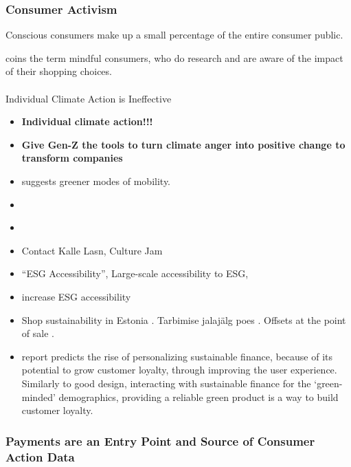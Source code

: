\documentclass[
  letterpaper,
  DIV=11,
  numbers=noendperiod]{scrartcl}
\makeatletter
\let\oldparagraph\paragraph
\renewcommand{\paragraph}{
    \@ifstar
      \xxxParagraphStar
      \xxxParagraphNoStar
  }
\newcommand{\xxxParagraphStar}[1]{\oldparagraph*{#1}\mbox{}}
\newcommand{\xxxParagraphNoStar}[1]{\oldparagraph{#1}\mbox{}}
\makeatother
\begin{document}
\subsubsection{Consumer Activism}\label{consumer-activism}

Conscious consumers make up a small percentage of the entire consumer
public.

\citep{milneMindfulConsumptionThree2020} coins the term mindful
consumers, who do research and are aware of the impact of their shopping
choices.

\paragraph{Individual Climate Action is
Ineffective}\label{individual-climate-action-is-ineffective}

\begin{itemize}
\item
  \citet{kristiansteensennielsenArgumentsIndividualClimate2022}
  \textbf{Individual climate action!!!}
\item
  \textbf{Give Gen-Z the tools to turn climate anger into positive
  change to transform companies}
\item
  \citet{echeverriaGreenMobilityWellbeing2022} suggests greener modes of
  mobility.
\item
  \citet{hymanShoppingChangeConsumer2017}
\item
  \citet{brantleyBrewingBoycottHow2021}
\item
  Contact Kalle Lasn, Culture Jam
\item
  ``ESG Accessibility'', Large-scale accessibility to ESG,
\item
  increase ESG accessibility
\item
  Shop sustainability in Estonia
  \citep{lillevaliUuringVastutustundlikkusEesti2022, EstwatchEstwatchiVarskest}.
  Tarbimise jalajälg poes
  \citep{helensaarmetsTarbimiselSilmagaNahtamatu2021}. Offsets at the
  point of sale \citep{GrenpayHeastaOma}.
\item
  \citet{GreenFintechTrends2020} report predicts the rise of
  personalizing sustainable finance, because of its potential to grow
  customer loyalty, through improving the user experience. Similarly to
  good design, interacting with sustainable finance for the
  `green-minded' demographics, providing a reliable green product is a
  way to build customer loyalty.
\end{itemize}

\subsubsection{Payments are an Entry Point and Source of Consumer Action
Data}\label{payments-are-an-entry-point-and-source-of-consumer-action-data}
\end{document}
